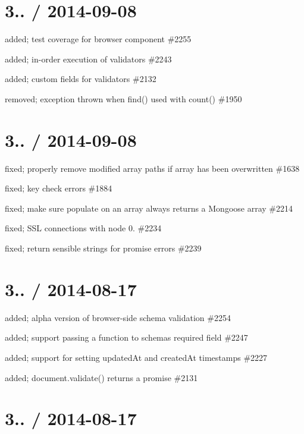 \section*{3.. / 2014-\/09-\/08 }


\begin{DoxyItemize}
\item added; test coverage for browser component \#2255
\item added; in-\/order execution of validators \#2243
\item added; custom fields for validators \#2132
\item removed; exception thrown when find() used with count() \#1950
\end{DoxyItemize}

\section*{3.. / 2014-\/09-\/08 }


\begin{DoxyItemize}
\item fixed; properly remove modified array paths if array has been overwritten \#1638
\item fixed; key check errors \#1884
\item fixed; make sure populate on an array always returns a Mongoose array \#2214
\item fixed; S\+SL connections with node 0. \#2234
\item fixed; return sensible strings for promise errors \#2239
\end{DoxyItemize}

\section*{3.. / 2014-\/08-\/17 }


\begin{DoxyItemize}
\item added; alpha version of browser-\/side schema validation \#2254
\item added; support passing a function to schemas {\ttfamily required} field \#2247
\item added; support for setting updated\+At and created\+At timestamps \#2227
\item added; document.\+validate() returns a promise \#2131
\end{DoxyItemize}

\section*{3.. / 2014-\/08-\/17 }


